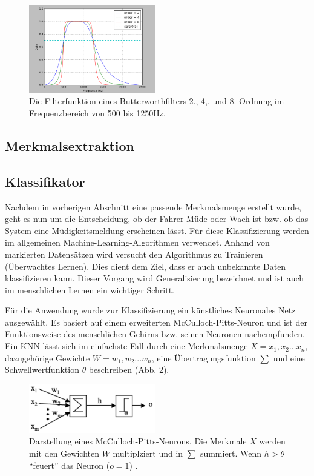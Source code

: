 {\begin{figure}[h] 
  \begin{center}
    \includegraphics[width=5.5cm]{butterworth_filter}
    \caption[Butterworth-Filter]{Die Filterfunktion eines Butterworthfilters 2., 4,. und 8. Ordnung im Frequenzbereich von 500 bis 1250Hz. \label{fig:butterworth_filter}}
  \end{center}
\end{figure}

\subsection{Merkmalsextraktion}
\label{sec:extraction}

\subsection{Klassifikator}
\label{sec:classification}
Nachdem in vorherigen Abschnitt eine passende Merkmalsmenge erstellt wurde, geht es nun um die Entscheidung, ob der Fahrer Müde oder Wach ist bzw. ob das System eine Müdigkeitsmeldung erscheinen lässt. Für diese Klassifizierung werden im allgemeinen Machine-Learning-Algorithmen verwendet. Anhand von markierten Datensätzen wird versucht den Algorithmus zu Trainieren (Überwachtes Lernen). Dies dient dem Ziel, dass er auch unbekannte Daten klassifizieren kann. Dieser Vorgang wird Generalisierung bezeichnet und ist auch im menschlichen Lernen ein wichtiger Schritt.

Für die Anwendung wurde zur Klassifizierung ein künstliches Neuronales Netz  ausgewählt. Es basiert auf einem erweiterten McCulloch-Pitts-Neuron \cite{ann} und ist der Funktionsweise des menschlichen Gehirns bzw. seinen Neuronen nachempfunden\cite{marsland_opac-b1129336}. Ein KNN lässt sich im einfachste Fall durch eine Merkmalsmenge $X = x_1, x_2 ... x_n$, dazugehörige Gewichte $W = w_1, w_2 ... w_n$, eine Übertragungsfunktion $\sum$ und eine Schwellwertfunktion $\theta$ beschreiben (Abb. \ref{fig:perceptron}).

\begin{figure}[h] 
  \begin{center}
    \includegraphics[width=5.5cm]{perceptron}
    \caption[Perceptron]{Darstellung eines McCulloch-Pitts-Neurons. Die Merkmale $X$ werden mit den Gewichten $W$ multiplziert und in $\sum$ summiert. Wenn $h > \theta$ "`feuert"' das Neuron ($o = 1$) \cite{marsland_opac-b1129336}. \label{fig:perceptron}}
  \end{center}
\end{figure}

}
